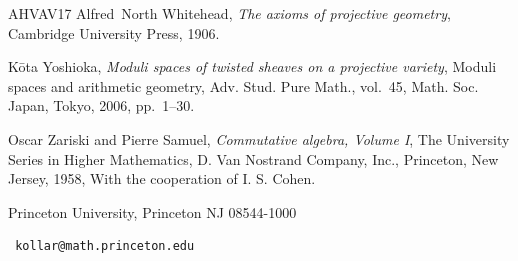 \documentclass{amsart}
\theoremstyle{definition}
\theoremstyle{remark}
\begin{document}
\begin{thebibliography}{AHVAV17}
Alfred~North Whitehead, \emph{The axioms of projective geometry}, Cambridge
  University Press, 1906.

K{\=o}ta Yoshioka, \emph{Moduli spaces of twisted sheaves on a projective
  variety}, Moduli spaces and arithmetic geometry, Adv. Stud. Pure Math.,
  vol.~45, Math. Soc. Japan, Tokyo, 2006, pp.~1--30. 

Oscar Zariski and Pierre Samuel, \emph{Commutative algebra, {V}olume {I}}, The
  University Series in Higher Mathematics, D. Van Nostrand Company, Inc.,
  Princeton, New Jersey, 1958, With the cooperation of I. S. Cohen.

\end{thebibliography}



\bigskip

\noindent  Princeton University, Princeton NJ 08544-1000

{\begin{verbatim} kollar@math.princeton.edu\end{verbatim}}
\end{document}
